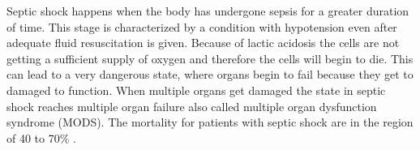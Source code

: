 Septic shock happens when the body has undergone sepsis for a greater duration of time. This stage is characterized by a condition with hypotension even after adequate fluid resuscitation is given. Because of lactic acidosis the cells are not getting a sufficient supply of oxygen and therefore the cells will begin to die. This can lead to a very dangerous state, where organs begin to fail because they get to damaged to function. When multiple organs get damaged the state in septic shock reaches multiple organ failure also called multiple organ dysfunction syndrome (MODS)\cite{baudouin2008,kanta2014}. The mortality for patients with septic shock are in the region of 40 to 70\% \cite{kanta2014}. 

